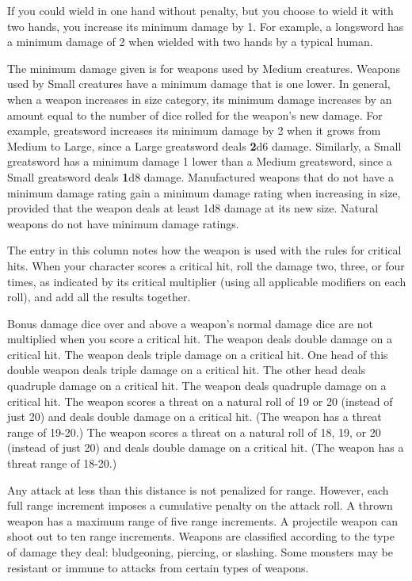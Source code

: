 If you could wield in one hand without penalty, but you choose to wield it with two hands, you increase its minimum damage by 1. For example, a longsword has a minimum damage of 2 when wielded with two hands by a typical human.

 The minimum damage given is for weapons used by Medium creatures. Weapons used by Small creatures have a minimum damage that is one lower. In general, when a weapon increases in size category, its minimum damage increases by an amount equal to the number of dice rolled for the weapon's new damage. For example, greatsword increases its minimum damage by 2 when it grows from Medium to Large, since a Large greatsword deals \textbf{2}d6 damage. Similarly, a Small greatsword has a minimum damage 1 lower than a Medium greatsword, since a Small greatsword deals \textbf{1}d8 damage. Manufactured weapons that do not have a minimum damage rating gain a minimum damage rating when increasing in size, provided that the weapon deals at least 1d8 damage at its new size. Natural weapons do not have minimum damage ratings.

 The entry in this column notes how the weapon is used with the rules for critical hits. When your character scores a critical hit, roll the damage two, three, or four times, as indicated by its critical multiplier (using all applicable modifiers on each roll), and add all the results together.

 Bonus damage dice over and above a weapon's normal damage dice are not multiplied when you score a critical hit.
 The weapon deals double damage on a critical hit.
 The weapon deals triple damage on a critical hit.
 One head of this double weapon deals triple damage on a critical hit. The other head deals quadruple damage on a critical hit.
 The weapon deals quadruple damage on a critical hit.
 The weapon scores a threat on a natural roll of 19 or 20 (instead of just 20) and deals double damage on a critical hit. (The weapon has a threat range of 19-20.)
 The weapon scores a threat on a natural roll of 18, 19, or 20 (instead of just 20) and deals double damage on a critical hit. (The weapon has a threat range of 18-20.)

 Any attack at less than this distance is not penalized for range. However, each full range increment imposes a cumulative  penalty on the attack roll. A thrown weapon has a maximum range of five range increments. A projectile weapon can shoot out to ten range increments.
 Weapons are classified according to the type of damage they deal: bludgeoning, piercing, or slashing. Some monsters may be resistant or immune to attacks from certain types of weapons.

